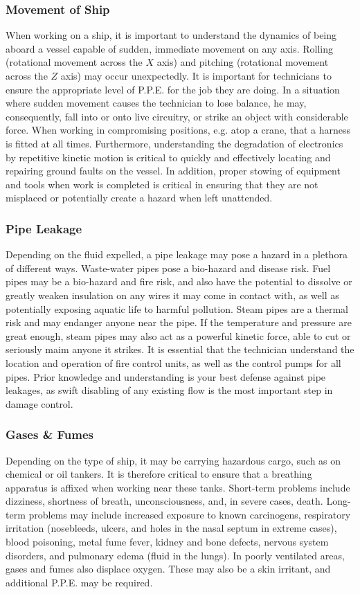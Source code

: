 \documentclass[11pt,a4paper]{article}
\begin{document}
\subsubsection{Movement of Ship}
When working on a ship, it is important to understand the dynamics of being aboard a vessel capable of sudden, immediate movement on any axis. Rolling (rotational movement across the $X$ axis) and pitching (rotational movement across the $Z$ axis) may occur unexpectedly. It is important for technicians to ensure the appropriate level of P.P.E. for the job they are doing. In a situation where sudden movement causes the technician to lose balance, he may, consequently, fall into or onto live circuitry, or strike an object with considerable force. When working in compromising positions, e.g. atop a crane, that a harness is fitted at all times. Furthermore, understanding the degradation of electronics by repetitive kinetic motion is critical to quickly and effectively locating and repairing ground faults on the vessel. In addition, proper stowing of equipment and tools when work is completed is critical in ensuring that they are not misplaced or potentially create a hazard when left unattended.
\subsubsection{Pipe Leakage}
Depending on the fluid expelled, a pipe leakage may pose a hazard in a plethora of different ways. Waste-water pipes pose a bio-hazard and disease risk. Fuel pipes may be a bio-hazard and fire risk, and also have the potential to dissolve or greatly weaken insulation on any wires it may come in contact with, as well as potentially exposing aquatic life to harmful pollution. Steam pipes are a thermal risk and may endanger anyone near the pipe. If the temperature and pressure are great enough, steam pipes may also act as a powerful kinetic force, able to cut or seriously maim anyone it strikes. It is essential that the technician understand the location and operation of fire control units, as well as the control pumps for all pipes. Prior knowledge and understanding is your best defense against pipe leakages, as swift disabling of any existing flow is the most important step in damage control.
\subsubsection{Gases \& Fumes}
Depending on the type of ship, it may be carrying hazardous cargo, such as on chemical or oil tankers. It is therefore critical to ensure that a breathing apparatus is affixed when working near these tanks. Short-term problems include dizziness, shortness of breath, unconsciousness, and, in severe cases, death. Long-term problems may include increased exposure to known carcinogens, respiratory irritation (nosebleeds, ulcers, and holes in the nasal septum in extreme cases), blood poisoning, metal fume fever, kidney and bone defects, nervous system disorders, and pulmonary edema (fluid in the lungs). In poorly ventilated areas, gases and fumes also displace oxygen. These may also be a skin irritant, and additional P.P.E. may be required.
\end{document}
